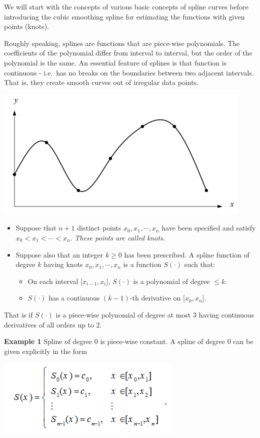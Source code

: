 \documentclass[
]{book}
\begin{document}
\hfill\break

We will start with the concepts of various basic concepts of spline curves before introducing the cubic smoothing spline for estimating the functions with given points (knots).

Roughly speaking, splines are functions that are piece-wise polynomials. The coefficients of the polynomial differ from interval to interval, but the order of the polynomial is the same. An essential feature of splines is that function is continuous - i.e.~has no breaks on the boundaries between two adjacent intervals. That is, they create smooth curves out of irregular data points.

\begin{center}\includegraphics[width=0.45\linewidth]{img10/00-SplineGist} \end{center}

\begin{itemize}
\item
  Suppose that \(n+1\) distinct points \(x_0, x_1, \cdots, x_n\) have been specified and satisfy \(x_0<x_1<\cdots < x_n\). \emph{These points are called knots}.
\item
  Suppose also that an integer \(k \ge 0\) has been prescribed. A spline function of degree \(k\) having knots \(x_0, x_1, \cdots, x_n\) is a function \(S(\cdot)\) such that:

  \begin{itemize}
  \item
    On each interval {[}\(x_{i-1}, x_i\){]}, \(S(\cdot)\) is a polynomial of degree \(\le k\).
  \item
    \(S(\cdot)\) has a continuous \((k-1)\)-th derivative on {[}\(x_0, x_n\){]}.
  \end{itemize}
\end{itemize}

That is if \(S(\cdot)\) is a piece-wise polynomial of degree at most 3 having continuous derivatives of all orders up to 2.

\textbf{Example 1} Spline of degree 0 is piece-wise constant. A spline of degree 0 can be given explicitly in the form

\begin{center}\includegraphics[width=0.4\linewidth]{img10/02-zeroDegSpline} \end{center}
\end{document}
